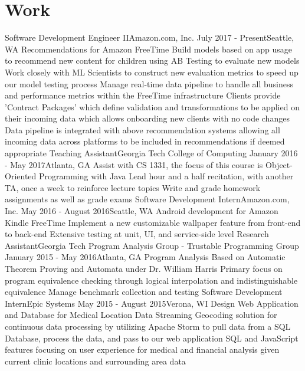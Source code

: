 \documentclass{resume_template}
\begin{document}
	\section{Work}
		\noindent\workinfo
			{Software Development Engineer II}{Amazon.com, Inc.}
			{July 2017 - Present}{Seattle, WA}
		\workitems
			{Recommendations for Amazon FreeTime}
			{Build models based on app usage to recommend new content for children using AB Testing to evaluate new models}
			{Work closely with ML Scientists to construct new evaluation metrics to speed up our model testing process}
		\workitems
			{Manage real-time data pipeline to handle all business and performance metrics within the FreeTime infrastructure}
			{Clients provide 'Contract Packages' which define validation and transformations to be applied on their incoming data which allows onboarding new clients with no code changes}
			{Data pipeline is integrated with above recommendation systems allowing all incoming data across platforms to be included in recommendations if deemed appropriate}
		\workinfo
			{Teaching Assistant}{Georgia Tech College of Computing}
			{January 2016 - May 2017}{Atlanta, GA}
		\workitems
			{Assist with CS 1331, the focus of this course is Object-Oriented Programming with Java}
			{Lead hour and a half recitation, with another TA, once a week to reinforce lecture topics}
			{Write and grade homework assignments as well as grade exams}
		\workinfo
			{Software Development Intern}{Amazon.com, Inc.}
			{May 2016 - August 2016}{Seattle, WA}
    	\workitems
		{Android development for Amazon Kindle FreeTime}
		{Implement a new customizable wallpaper feature from front-end to back-end}
		{Extensive testing at unit, UI, and service-side level}
		\workinfo
		{Research Assistant}{Georgia Tech Program Analysis Group - Trustable Programming Group}
		{January 2015 - May 2016}{Atlanta, GA}
		\workitems
		{Program Analysis Based on Automatic Theorem Proving and Automata under Dr. William Harris}
		{Primary focus on program equivalence checking through logical interpolation and indistinguishable equivalence}
		{Manage benchmark collection and testing}
		\workinfo
			{Software Development Intern}{Epic Systems}
			{May 2015 - August 2015}{Verona, WI}
		\workitems
			{Design Web Application and Database for Medical Location Data}
			{Streaming Geocoding solution for continuous data processing by utilizing Apache Storm to pull data from a SQL
				Database, process the data, and pass to our web application}
			{SQL and JavaScript features focusing on user experience for medical and financial analysis given current clinic
				locations and surrounding area data}
		
\end{document}
